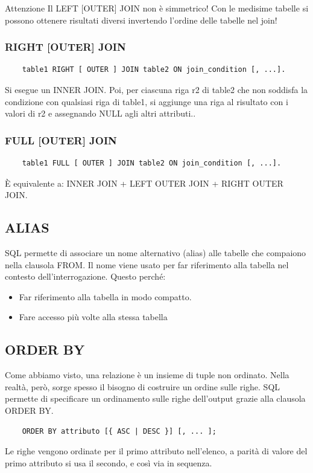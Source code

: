 \documentclass[a4paper]{article}
\begin{document}
\begin{Warning}{Attenzione}{}
Il LEFT [OUTER] JOIN non è simmetrico! Con le medisime tabelle si possono ottenere risultati diversi invertendo l’ordine delle
tabelle nel join!
\end{Warning}

\subsubsection{RIGHT [OUTER] JOIN}

\begin{verbatim}
    table1 RIGHT [ OUTER ] JOIN table2 ON join_condition [, ...].
\end{verbatim}
\noindent
Si esegue un INNER JOIN. Poi, per ciascuna riga r2 di
table2 che non soddisfa la condizione con qualsiasi
riga di table1, si aggiunge una riga al risultato con i
valori di r2 e assegnando NULL agli altri attributi..

\subsubsection{FULL [OUTER] JOIN}

\begin{verbatim}
    table1 FULL [ OUTER ] JOIN table2 ON join_condition [, ...].
\end{verbatim}

È equivalente a: INNER JOIN + LEFT OUTER JOIN + RIGHT OUTER JOIN.

\subsection{ALIAS}

SQL permette di associare un nome alternativo (alias) alle tabelle
che compaiono nella clausola FROM. Il nome viene usato per far riferimento alla tabella nel contesto
dell’interrogazione. Questo perché:
\begin{itemize}
    \item Far riferimento alla tabella in modo compatto.
    \item Fare accesso più volte alla stessa tabella
\end{itemize}

\subsection{ORDER BY}

Come abbiamo visto, una relazione è un insieme di tuple non ordinato. Nella
realtà, però, sorge spesso il bisogno di costruire un ordine sulle righe.
SQL permette di specificare un ordinamento sulle righe dell'output grazie alla
clausola ORDER BY.
\begin{verbatim}
    ORDER BY attributo [{ ASC | DESC }] [, ... ];
\end{verbatim}
\noindent
Le righe vengono ordinate per il primo attributo nell’elenco, a parità di valore
del primo attributo si usa il secondo, e così via in sequenza.
\end{document}
